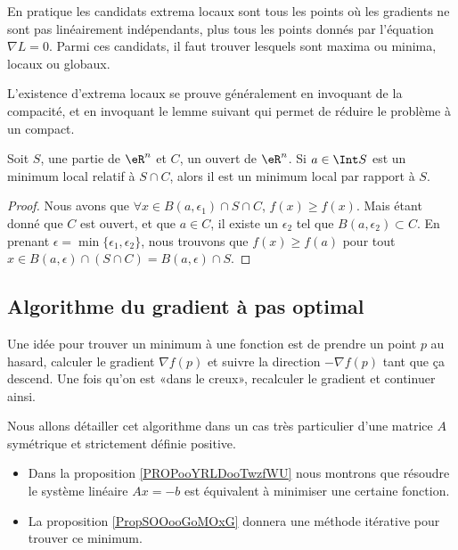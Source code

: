 En pratique les candidats extrema locaux sont tous les points où les gradients ne sont pas linéairement indépendants, plus tous les points donnés par l'équation $\nabla L=0$. Parmi ces candidats, il faut trouver lesquels sont maxima ou minima, locaux ou globaux.

L'existence d'extrema locaux se prouve généralement en invoquant de la compacité, et en invoquant le lemme suivant qui permet de réduire le problème à un compact.

\begin{lemma}       \label{LemmeMinSCimpliqueS}
    Soit $S$, une partie de $\eR^n$ et $C$, un ouvert de $\eR^n$. Si $a\in\Int S$ est un minimum local relatif à $S\cap C$, alors il est un minimum local par rapport à $S$.
\end{lemma}

\begin{proof}
    Nous avons que $\forall x\in B(a,\epsilon_1)\cap S\cap C$, $f(x)\geq f(x)$. Mais étant donné que $C$ est ouvert, et que $a\in C$, il existe un $\epsilon_2$ tel que $B(a,\epsilon_2)\subset C$. En prenant $\epsilon=\min\{ \epsilon_1,\epsilon_2 \}$, nous trouvons que $f(x)\geq f(a)$ pour tout $x\in B(a,\epsilon)\cap(S\cap C)=B(a,\epsilon)\cap S$.
\end{proof}

\subsection{Algorithme du gradient à pas optimal}

Une idée pour trouver un minimum à une fonction est de prendre un point \( p\) au hasard, calculer le gradient \(\nabla f(p) \) et suivre la direction \(-\nabla f(p)\) tant que ça descend. Une fois qu'on est «dans le creux», recalculer le gradient et continuer ainsi.

Nous allons détailler cet algorithme dans un cas très particulier d'une matrice \( A\) symétrique et strictement définie positive. 
\begin{itemize}
    \item Dans la proposition \ref{PROPooYRLDooTwzfWU} nous montrons que résoudre le système linéaire \( Ax=-b\) est équivalent à minimiser une certaine fonction.
    \item La proposition \ref{PropSOOooGoMOxG} donnera une méthode itérative pour trouver ce minimum.
\end{itemize}

